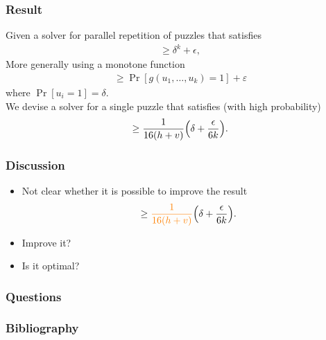 \documentclass[first,firstsupp, last]{ETHclass}
\begin{document}
\begin{frame} [t]
  \frametitle{Result}
      Given a solver for parallel repetition of puzzles that satisfies
      \begin{align*}
        \geq \delta^k + \epsilon,
      \end{align*}
      \pause
      More generally using a monotone function
      \begin{align*}
        \geq \Pr[g(u_1, \dots, u_k) = 1] + \varepsilon
      \end{align*}
      where $\Pr[u_i = 1] = \delta$. \\
      \pause
      We devise a solver for a single puzzle that satisfies (with high probability)
      \begin{align*}
         \geq \frac{1}{16(h+v)} \Bigl(\delta + \frac{\epsilon}{6k}\Bigr).
      \end{align*}
\end{frame}

\begin{frame}[t]
  \frametitle{Discussion}
  \begin{itemize}
    \item Not clear whether it is possible to improve the result
      \begin{align*}
         \geq \textcolor{orange}{\frac{1}{16(h+v)}} \Bigl(\delta + \frac{\epsilon}{6k}\Bigr).
      \end{align*}
      \pause
    \item Improve it? \pause \textcolor{orange}{\xmark}
    \item Is it optimal? \pause \textcolor{orange}{\xmark}
  \end{itemize}
\end{frame}

\begin{frame}
\frametitle{Questions}
\end{frame}


\begin{frame}[t]
\frametitle{Bibliography}


\end{frame}
\end{document}
